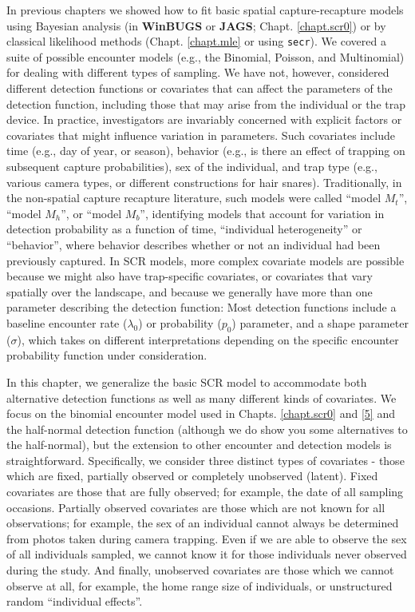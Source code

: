 In previous chapters we showed how to fit basic spatial
capture-recapture models using Bayesian analysis (in {\bf WinBUGS} or
{\bf JAGS};
Chapt. \ref{chapt.scr0}) or by classical likelihood methods
(Chapt. \ref{chapt.mle} or using \mbox{\tt secr}). We covered a suite of possible encounter models
(e.g., the Binomial, Poisson, and Multinomial) for
dealing with different types of sampling. We have not, however,
considered different detection functions or covariates that can affect
the parameters of the detection function, including those that may
arise from the individual or the trap device. In practice, 
investigators are invariably concerned
with explicit factors or covariates that might influence variation in
parameters. Such covariates
include time (e.g., day of year, or season), behavior (e.g., is there an 
effect of trapping on subsequent capture probabilities), sex of the individual, and trap
type (e.g., various camera types, or different constructions for hair
snares). Traditionally, in the non-spatial capture recapture
literature, such models were called ``model $M_t$'', ``model
$M_h$'', or ``model $M_b$'', identifying models that account for
variation in detection probability as a function of time, ``individual
heterogeneity'' or ``behavior'', where behavior describes
whether or not an individual had been previously captured. In SCR
models, more complex covariate models are possible because we might
also have trap-specific covariates, or covariates that vary spatially
over the landscape, and because we generally have more than one 
parameter describing the detection function:
Most detection functions include a baseline encounter
rate ($\lambda_0$) or probability ($p_0$) parameter, and a shape parameter
($\sigma$), which takes on different interpretations depending on
the specific encounter probability function under consideration. 

In this chapter, we generalize the basic SCR model to accommodate both 
alternative detection functions as well as
many different kinds of covariates. We focus on the binomial encounter
model used in Chapts. \ref{chapt.scr0} and \ref{5} and the half-normal 
detection function (although we do show you some alternatives to the half-normal),
but the extension to other encounter and detection models is
straightforward.  Specifically, we consider three distinct types of
covariates - those which are fixed, partially observed or completely
unobserved (latent).  Fixed covariates are those that are fully
observed; for example, the date of all sampling occasions.  Partially
observed covariates are those which are not known for all
observations; for example, the sex of an individual cannot always be
determined from photos taken during camera trapping.  Even if we are
able to observe the sex of all individuals sampled, we cannot know it
for those individuals never observed during the study.  And finally,
unobserved covariates are those which we cannot observe at all, for
example, the home range size of individuals, or unstructured random
``individual effects''.


